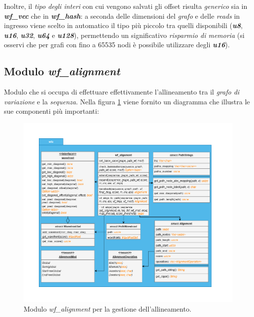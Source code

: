     Inoltre, il \emph{tipo degli interi} con cui vengono salvati gli offset risulta \emph{generico} sia in \textbf{\textit{wf\_vec}} che in \textbf{\textit{wf\_hash}}: a seconda delle dimensioni del \emph{grafo} e delle \emph{reads} in ingresso viene scelto in automatico il tipo più piccolo tra quelli disponibili (\textbf{\textit{u8}}, \textbf{\textit{u16}}, \textbf{\textit{u32}}, \textbf{\textit{u64}} e \textbf{\textit{u128}}), permettendo un significativo \emph{risparmio di memoria} (si osservi che per grafi con fino a 65535 nodi è possibile utilizzare degli \textbf{\textit{u16}}). 

\subsection{Modulo \textit{wf\_alignment}}
\label{section:wf_alignment}
    Modulo che si occupa di effettuare effettivamente l'allineamento tra il \emph{grafo di variazione} e la \emph{sequenza}. Nella figura \ref{fig:wf_alignment} viene fornito un diagramma che illustra le sue componenti più importanti:
    \begin{figure}[h]
        \centering
        \includegraphics[width=1\linewidth]{images/wf_alignment_diagram.png} 
        \caption[Modulo allineamento]{Modulo \emph{wf\_alignment} per la gestione dell'allineamento.}
        \label{fig:wf_alignment}
        \end{figure}
    \clearpage

